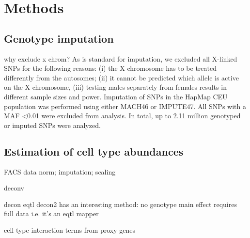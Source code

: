 \section{Methods}

\subsection{Genotype imputation}

why exclude x chrom?
As is standard for imputation, we excluded all X-linked SNPs for the following reasons: (i) the X chromosome has to be treated differently from the autosomes; (ii) it cannot be predicted which allele is active on the X chromosome, (iii) testing males separately from females results in different sample sizes and power. Imputation of SNPs in the HapMap CEU population was performed using either MACH46 or IMPUTE47. All SNPs with a MAF <0.01 were excluded from analysis. In total, up to 2.11 million genotyped or imputed SNPs were analyzed.

\subsection{Estimation of cell type abundances}


FACS data norm; imputation; scaling

deconv

    decon eqtl
        decon2 has an interesting method: no genotype main effect
        requires full data i.e. it's an eqtl mapper

    cell type interaction terms from proxy genes



